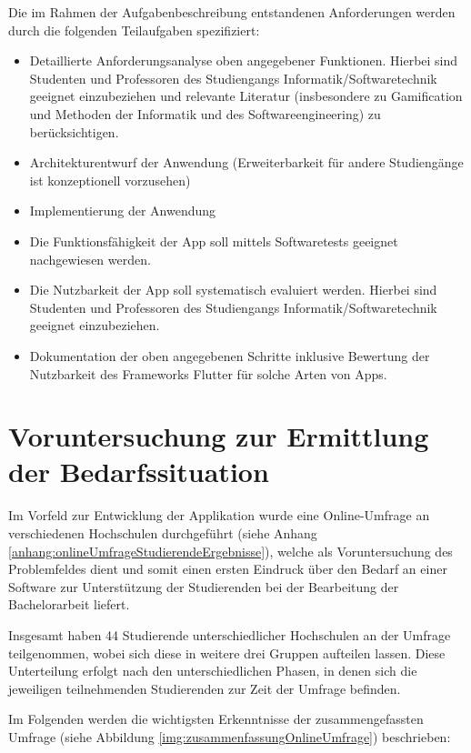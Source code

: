 \documentclass[bibliography=totoc,listof=totoc,BCOR=5mm,DIV=12,oneside]{scrbook}
\begin{document}
\par Die im Rahmen der Aufgabenbeschreibung entstandenen Anforderungen werden durch die folgenden Teilaufgaben spezifiziert:
\begin{itemize}
\item Detaillierte Anforderungsanalyse oben angegebener Funktionen. Hierbei sind Studenten und Professoren des Studiengangs Informatik/Softwaretechnik geeignet einzubeziehen und relevante Literatur (insbesondere zu Gamification und Methoden der Informatik und des Softwareengineering) zu berücksichtigen.
\item Architekturentwurf der Anwendung (Erweiterbarkeit für andere Studiengänge ist konzeptionell vorzusehen)
\item Implementierung der Anwendung
\item Die Funktionsfähigkeit der App soll mittels Softwaretests geeignet nachgewiesen werden.
\item Die Nutzbarkeit der App soll systematisch evaluiert werden. Hierbei sind Studenten und Professoren des Studiengangs Informatik/Softwaretechnik geeignet einzubeziehen.
\item Dokumentation der oben angegebenen Schritte inklusive Bewertung der Nutzbarkeit des Frameworks Flutter für solche Arten von Apps.
\end{itemize}

\newpage
\section{Voruntersuchung zur Ermittlung der Bedarfssituation}
\par \bigskip Im Vorfeld zur Entwicklung der Applikation wurde eine Online-Umfrage an verschiedenen Hochschulen durchgeführt (siehe Anhang \ref{anhang:onlineUmfrageStudierendeErgebnisse}), welche als Voruntersuchung des Problemfeldes dient und somit einen ersten Eindruck über den Bedarf an einer Software zur Unterstützung der Studierenden bei der Bearbeitung der Bachelorarbeit liefert.

\par \bigskip Insgesamt haben 44 Studierende unterschiedlicher Hochschulen an der Umfrage teilgenommen, wobei sich diese in weitere drei Gruppen aufteilen lassen. Diese Unterteilung erfolgt nach den unterschiedlichen Phasen, in denen sich die jeweiligen teilnehmenden Studierenden zur Zeit der Umfrage befinden. 

\par \bigskip Im Folgenden werden die wichtigsten Erkenntnisse der zusammengefassten Umfrage (siehe Abbildung \ref{img:zusammenfassungOnlineUmfrage}) beschrieben:
\end{document}
